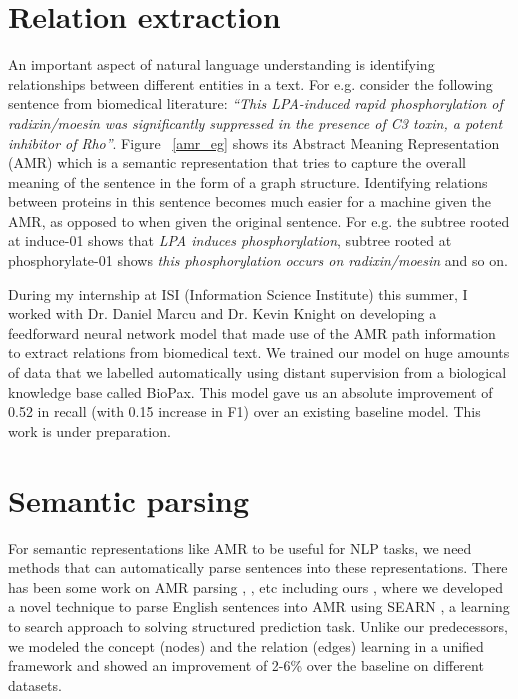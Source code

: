 \documentclass[11pt,a4paper]{article}
\begin{document}
\section{Relation extraction}
An important aspect of natural language understanding is identifying relationships between different entities in a text. For e.g. consider the following sentence from biomedical literature: \textit{``This LPA-induced rapid phosphorylation of radixin/moesin was significantly suppressed in the presence of C3 toxin, a potent inhibitor of Rho''}. Figure ~\ref{amr_eg} shows its Abstract Meaning Representation (AMR) \cite{banarescu2013abstract} which is a semantic representation that tries to capture the overall meaning of the sentence in the form of a graph structure. Identifying relations between proteins in this sentence becomes much easier for a machine given the AMR, as opposed to when given the original sentence. For e.g. the subtree rooted at induce-01 shows that \textit{LPA induces phosphorylation}, subtree rooted at phosphorylate-01 shows \textit{this phosphorylation occurs on radixin/moesin} and so on. 

During my internship at ISI (Information Science Institute) this summer, I worked with Dr. Daniel Marcu and Dr. Kevin Knight on developing a feedforward neural network model that made use of the AMR path information to extract relations from biomedical text. We trained our model on huge amounts of data that we labelled automatically using distant supervision from a biological knowledge base called BioPax. This model gave us an absolute improvement of 0.52 in recall (with 0.15 increase in F1) over an existing baseline model. This work is under preparation.


\section{Semantic parsing}
For semantic representations like AMR to be useful for NLP tasks, we need methods that can automatically parse sentences into these representations. There has been some work on AMR parsing \cite{flanigan-EtAl:2014:P14-1}, \cite{DBLP:conf/emnlp/PustHKMM15}, etc including ours \cite{rao2015parser}, where we developed a novel technique to parse English sentences into AMR using SEARN \cite{daume2009search}, a learning to search approach to solving structured prediction task. Unlike our predecessors, we modeled the concept (nodes) and the relation (edges) learning in a unified framework and showed an improvement of 2-6\% over the baseline on different datasets. 
\end{document}

